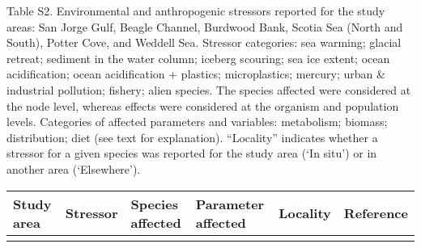 \documentclass[
]{article}
\begin{document}
\newpage
\begin{landscape}
\scriptsize

Table S2. Environmental and anthropogenic stressors reported for the
study areas: San Jorge Gulf, Beagle Channel, Burdwood Bank, Scotia Sea
(North and South), Potter Cove, and Weddell Sea. Stressor categories:
sea warming; glacial retreat; sediment in the water column; iceberg
scouring; sea ice extent; ocean acidification; ocean acidification +
plastics; microplastics; mercury; urban \& industrial pollution;
fishery; alien species. The species affected were considered at the node
level, whereas effects were considered at the organism and population
levels. Categories of affected parameters and variables: metabolism;
biomass; distribution; diet (see text for explanation). ``Locality''
indicates whether a stressor for a given species was reported for the
study area (`In situ') or in another area (`Elsewhere').

\begin{longtable}{ L{2.1cm} L{2.5cm} L{4cm} L{2.5cm} L{2cm} L{3cm} }
\hline
\textbf{Study area} & \textbf{Stressor} & \textbf{Species affected} & \textbf{Parameter affected} & \textbf{Locality} & \textbf{Reference} \\
\hline
\endhead
\endfoot
\hline
\endlastfoot


\end{longtable}
\end{landscape}
\end{document}
